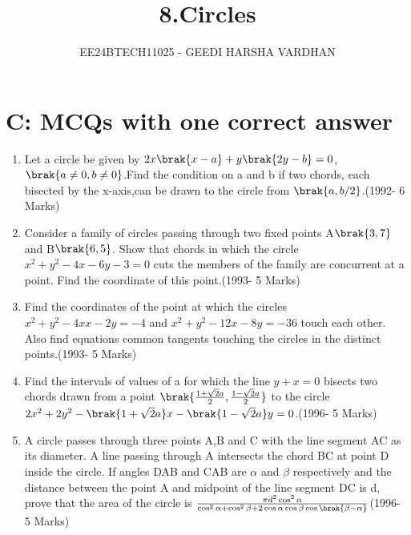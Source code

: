 \documentclass[journal,12pt,twocolumn]{IEEEtran}
\theoremstyle{remark}
\begin{document}

\vspace{3cm}

\title{8.Circles }
\author{EE24BTECH11025 - GEEDI HARSHA VARDHAN }
\maketitle
\newpage
\bigskip
\section{C: MCQs with one correct answer}

\renewcommand{\thefigure}{\theenumi}
\renewcommand{\thetable}{\theenumi}

\begin{enumerate}

\item Let a circle be given by $2x\brak{x-a}+y\brak{2y-b}=0$,$\brak{a\neq0,b\neq0}$.Find the condition on a and b if two chords, each bisected by the x-axis,can be drawn to the circle from $\brak{a,b/2}$.\hfill(1992- 6 Marks)\\




\item Consider a family of circles passing through two fixed points A$\brak{3,7}$ and B$\brak{6,5}$. Show that chords in which the circle $x^2+y^2-4x-6y-3=0$ cuts the members of the family are concurrent at a point. Find the coordinate of this point.\hfill(1993- 5 Marks)\\





\item Find the coordinates of the point at which the circles $x^2+y^2-4xx-2y=-4$ and $x^2+y^2-12x-8y=-36$ touch each other. Also find equations common tangents touching the circles in the distinct points.\hfill(1993- 5 Marks)\\


\item Find the intervals of values of a for which the line $y+x=0$ bisects two chords drawn from a point $\brak {\frac{1+\sqrt{2}a}{2},\frac{1-\sqrt{2}a}{2}}$ to the circle $2x^2+2y^2-\brak{1+\sqrt{2}a}x-\brak{1-\sqrt{2}a}y=0$.\hfill(1996- 5 Marks)\\





\item A circle passes through three points A,B and C with the line segment AC as its diameter. A line passing through A intersects the chord BC at point D inside the circle. If angles DAB and CAB are $\alpha$ and $\beta$ respectively and the distance between the point A and midpoint of the line segment DC is d, prove that the area of the circle is $\frac{\pi d^2 \cos^2{\alpha} }{\cos^2{\alpha}+\cos^2{\beta}+ 2\cos{\alpha} \cos{\beta} \cos{\brak{\beta-\alpha}}}$\hfill(1996- 5 Marks)\\






\end{enumerate}
\end{document}
